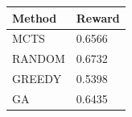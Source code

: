 \begin{tabular}{ll}
\hline
Method & Reward \\
\hline
  MCTS & 0.6566 \\
  RANDOM & 0.6732 \\
  GREEDY & 0.5398 \\
  GA & 0.6435 \\
\hline
\end{tabular}

